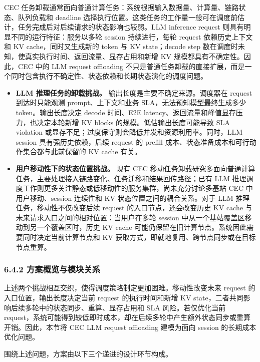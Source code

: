 CEC 任务卸载通常面向普通计算任务：系统根据输入数据量、计算量、链路状态、队列负载和 deadline 选择执行位置。这类任务的工作量一般可在调度前估计，任务完成后对后续请求的状态影响也较弱。LLM inference request 则具有明显不同的运行特征：服务以多轮 session 持续进行，每轮 request 依赖历史上下文和 KV cache，同时又生成新的 token 与 KV state；decode step 数在调度时未知，使真实执行时间、返回流量、显存占用和新增 KV 规模都具有不确定性。因此，CEC 中的 LLM request offloading 不只是普通任务卸载的直接扩展，而是一个同时包含执行不确定性、状态依赖和长期状态演化的调度问题。

\begin{itemize}
    \item \textbf{LLM 推理任务的卸载挑战。} 输出长度是主要不确定来源。调度器在 request 到达时只能观测 prompt、上下文和业务 SLA，无法预知模型最终生成多少 token。输出长度决定 decode 时间、E2E latency、返回流量和峰值显存压力，也决定本轮新增 KV blocks 的规模。低估输出长度可能导致 SLA violation 或显存不足；过度保守则会降低并发和资源利用率。同时，LLM session 具有强历史依赖，后续 request 的 prefill 成本、状态准备成本和可行动作集合都与此前保留的 KV cache 有关。
    \item \textbf{用户移动性下的状态位置挑战。} 现有 CEC 移动任务卸载研究多面向普通计算任务，主要处理接入链路变化、任务迁移和结果回传路径；已有 LLM 推理调度工作则更多关注静态或低移动性的服务集群，尚未充分讨论多基站 CEC 中用户移动、session 连续性和 KV 状态位置之间的耦合关系。对于 LLM 推理任务，移动性不仅改变后续 request 的入口节点，还会改变历史 KV cache 与未来请求入口之间的相对位置：当用户在多轮 session 中从一个基站覆盖区移动到另一个覆盖区时，历史 KV cache 可能仍保留在旧计算节点。系统因此需要同时决定当前计算节点和 KV 获取方式，即就地复用、跨节点同步或在目标节点重算。
\end{itemize}

\subsubsection*{6.4.2 方案概览与模块关系}

上述两个挑战相互交织，使得调度策略制定更加困难。移动性改变未来 request 的入口位置，输出长度决定当前 request 的执行时间和新增 KV state，二者共同影响后续多轮中的状态同步、重算、显存占用和 SLA 风险。若仅优化当前 request，系统可能得到较低即时成本，却在后续多轮中产生额外状态同步或重算开销。因此，本节将 CEC LLM request offloading 建模为面向 session 的长期成本优化问题。

围绕上述问题，方案由以下三个递进的设计环节构成。

